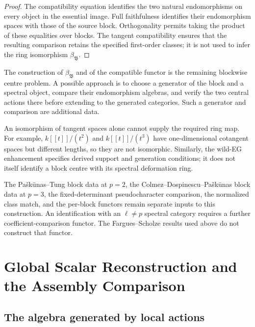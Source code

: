 \begin{proof}
The compatibility equation identifies the two
natural endomorphisms on every object in the
essential image. Full faithfulness identifies
their endomorphism spaces with those of the
source block. Orthogonality permits taking the
product of these equalities over blocks.
The tangent compatibility ensures that the
resulting comparison retains the specified
first-order classes; it is not used to infer
the ring isomorphism \(\beta_{\mathfrak B}\).
\end{proof}

The construction of \(\beta_{\mathfrak B}\) and
of the compatible functor is the remaining
blockwise centre problem. A possible approach
is to choose a generator of the block and a
spectral object, compare their endomorphism
algebras, and verify the two central actions
there before extending to the generated
categories. Such a generator and comparison
are additional data.

An isomorphism of tangent spaces alone cannot
supply the required ring map. For example,
\(k[[t]]/(t^2)\) and \(k[[t]]/(t^3)\) have
one-dimensional cotangent spaces but different
lengths, so they are not isomorphic.
Similarly, the wild-EG enhancement specifies
derived support and generation conditions;
it does not itself identify a block centre
with its spectral deformation ring.

The Pa{\v s}k{\=u}nas--Tung block data at
\(p=2\), the Colmez--Dospinescu--Pa{\v s}k{\=u}nas
block data at \(p=3\), the fixed-determinant
pseudocharacter comparison, the normalized
class match, and the per-block functors remain
separate inputs to this construction.
An identification with an \(\ell\neq p\)
spectral category requires a further
coefficient-comparison functor. The
Fargues--Scholze results used above do not
construct that functor.

\section{Global Scalar Reconstruction and the Assembly Comparison}
\label{v4-arith:w10-e:glue}

\subsection{The algebra generated by local actions}

